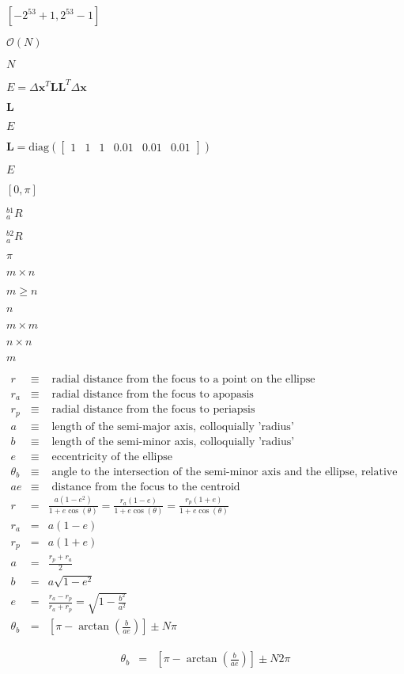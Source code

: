 \documentclass{article}
\begin{document}
$[-2^{53}+1, 2^{53}-1]$
\pagebreak

$ \mathcal{O}(N) $
\pagebreak

$N$
\pagebreak

$ E = \Delta \mathbf{x}^T \mathbf{L} \mathbf{L}^T \Delta \mathbf{x} $
\pagebreak

$\mathbf{L}$
\pagebreak

$E$
\pagebreak

$\mathbf{L} = \mathrm{diag}\left( \begin{bmatrix} 1 & 1 & 1 & 0.01 & 0.01 & 0.01 \end{bmatrix} \right) $
\pagebreak

$ E $
\pagebreak

$ [0 , \pi] $
\pagebreak

$ _a^{b1} R $
\pagebreak

$ _a^{b2} R $
\pagebreak

$ \pi $
\pagebreak

$m \times n$
\pagebreak

$ m \geq n $
\pagebreak

$n$
\pagebreak

$m \times m$
\pagebreak

$n \times n$
\pagebreak

$m$
\pagebreak

\begin{eqnarray*} r &\equiv& \textrm{ radial distance from the focus to a point on the ellipse}\\ r_a &\equiv& \textrm{ radial distance from the focus to apopasis}\\ r_p &\equiv& \textrm{ radial distance from the focus to periapsis}\\ a &\equiv& \textrm{ length of the semi-major axis, colloquially 'radius'}\\ b &\equiv& \textrm{ length of the semi-minor axis, colloquially 'radius'}\\ e &\equiv& \textrm{ eccentricity of the ellipse}\\ \theta_b &\equiv& \textrm{ angle to the intersection of the semi-minor axis and the ellipse, relative to the focus}\\ ae &\equiv& \textrm{ distance from the focus to the centroid}\\ r &=& \frac{a(1-e^2)}{1+e\cos(\theta)} = \frac{r_a(1-e)}{1+e\cos(\theta)} = \frac{r_p(1+e)}{1+e\cos(\theta)}\\ r_a &=& a(1-e)\\ r_p &=& a(1+e)\\ a &=& \frac{r_p+r_a}{2}\\ b &=& a\sqrt{1-e^2}\\ e &=& \frac{r_a-r_p}{r_a+r_p} = \sqrt{1-\frac{b^2}{a^2}}\\ \theta_b &=& \left[\pi - \arctan\left(\frac{b}{ae}\right)\right] \pm N\pi \end{eqnarray*}
\pagebreak

\begin{eqnarray*} \theta_b &=& \left[\pi - \arctan\left(\frac{b}{ae}\right)\right] \pm N 2\pi \end{eqnarray*}
\pagebreak
\end{document}

